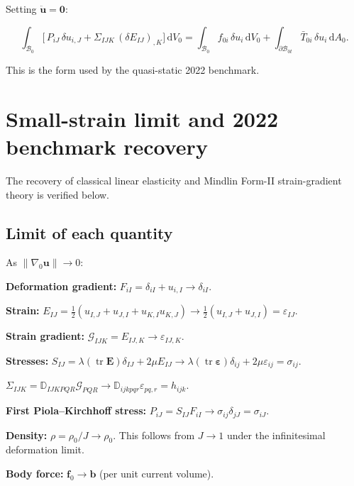\documentclass[11pt]{article}
\DeclareMathOperator{\tr}{tr}
\begin{document}
Setting $\ddot{\mathbf{u}}=\mathbf{0}$:

\begin{equation}
\int_{\mathcal{B}_{0}}
\bigl[\,P_{iJ}\,\delta u_{i,J}
      + \Sigma_{IJK}\,(\delta E_{IJ})_{,K}\bigr]\,
\mathrm{d}V_{0}
= \int_{\mathcal{B}_{0}} f_{0i}\,\delta u_{i}\,\mathrm{d}V_{0}
+ \int_{\partial\mathcal{B}_{0t}} \bar{T}_{0i}\,\delta u_{i}\,
  \mathrm{d}A_{0}.
\end{equation}

This is the form used by the quasi-static 2022 benchmark.

\section{Small-strain limit and 2022 benchmark recovery}

The recovery of classical linear elasticity \cite{Holzapfel2000} and Mindlin Form-II strain-gradient theory \cite{Mindlin1964,MindlinEshel1968} is verified below.

\subsection{Limit of each quantity}

As $\|\nabla_{0}\mathbf{u}\|\to 0$:

\textbf{Deformation gradient:}
$F_{iI} = \delta_{iI}+u_{i,I} \to \delta_{iI}$.

\textbf{Strain:}
$E_{IJ} = \tfrac12(u_{I,J}+u_{J,I}+u_{K,I}u_{K,J})
\to \tfrac12(u_{I,J}+u_{J,I}) = \varepsilon_{IJ}$.

\textbf{Strain gradient:}
$\mathcal{G}_{IJK} = E_{IJ,K} \to \varepsilon_{IJ,K}$.

\textbf{Stresses:}
$S_{IJ} = \lambda(\tr\mathbf{E})\delta_{IJ}+2\mu E_{IJ}
\to \lambda(\tr\boldsymbol{\varepsilon})\delta_{ij}+2\mu\varepsilon_{ij}
= \sigma_{ij}$.

$\Sigma_{IJK} = \mathbb{D}_{IJKPQR}\mathcal{G}_{PQR}
\to \mathbb{D}_{ijkpqr}\varepsilon_{pq,r} = h_{ijk}$.

\textbf{First Piola--Kirchhoff stress:}
$P_{iJ} = S_{IJ}F_{iI} \to \sigma_{ij}\delta_{jJ} = \sigma_{iJ}$.

\textbf{Density:}
$\rho = \rho_{0}/J \to \rho_{0}$. This follows from $J \to 1$ under the infinitesimal deformation limit.

\textbf{Body force:}
$\mathbf{f}_{0} \to \mathbf{b}$ (per unit current volume).
\end{document}
